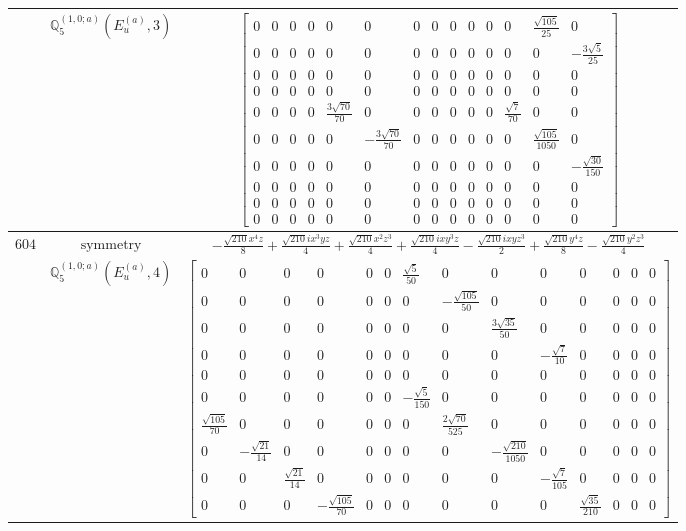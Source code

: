 \documentclass[fleqn,8pt,landscape]{jsarticle}
\begin{document}
\begin{longtable}{ccc}
$  $ & $ \mathbb{Q}_{5}^{(1,0;a)}(E_{u}^{(a)},3) $ & $ \begin{bmatrix} 0 & 0 & 0 & 0 & 0 & 0 & 0 & 0 & 0 & 0 & 0 & 0 & \frac{\sqrt{105}}{25} & 0 \\ 0 & 0 & 0 & 0 & 0 & 0 & 0 & 0 & 0 & 0 & 0 & 0 & 0 & - \frac{3 \sqrt{5}}{25} \\ 0 & 0 & 0 & 0 & 0 & 0 & 0 & 0 & 0 & 0 & 0 & 0 & 0 & 0 \\ 0 & 0 & 0 & 0 & 0 & 0 & 0 & 0 & 0 & 0 & 0 & 0 & 0 & 0 \\ 0 & 0 & 0 & 0 & \frac{3 \sqrt{70}}{70} & 0 & 0 & 0 & 0 & 0 & 0 & \frac{\sqrt{7}}{70} & 0 & 0 \\ 0 & 0 & 0 & 0 & 0 & - \frac{3 \sqrt{70}}{70} & 0 & 0 & 0 & 0 & 0 & 0 & \frac{\sqrt{105}}{1050} & 0 \\ 0 & 0 & 0 & 0 & 0 & 0 & 0 & 0 & 0 & 0 & 0 & 0 & 0 & - \frac{\sqrt{30}}{150} \\ 0 & 0 & 0 & 0 & 0 & 0 & 0 & 0 & 0 & 0 & 0 & 0 & 0 & 0 \\ 0 & 0 & 0 & 0 & 0 & 0 & 0 & 0 & 0 & 0 & 0 & 0 & 0 & 0 \\ 0 & 0 & 0 & 0 & 0 & 0 & 0 & 0 & 0 & 0 & 0 & 0 & 0 & 0 \end{bmatrix} $ \\ \hline
$ 604 $ & $ \text{symmetry} $ & $ - \frac{\sqrt{210} x^{4} z}{8} + \frac{\sqrt{210} i x^{3} y z}{4} + \frac{\sqrt{210} x^{2} z^{3}}{4} + \frac{\sqrt{210} i x y^{3} z}{4} - \frac{\sqrt{210} i x y z^{3}}{2} + \frac{\sqrt{210} y^{4} z}{8} - \frac{\sqrt{210} y^{2} z^{3}}{4} $ \\
$  $ & $ \mathbb{Q}_{5}^{(1,0;a)}(E_{u}^{(a)},4) $ & $ \begin{bmatrix} 0 & 0 & 0 & 0 & 0 & 0 & \frac{\sqrt{5}}{50} & 0 & 0 & 0 & 0 & 0 & 0 & 0 \\ 0 & 0 & 0 & 0 & 0 & 0 & 0 & - \frac{\sqrt{105}}{50} & 0 & 0 & 0 & 0 & 0 & 0 \\ 0 & 0 & 0 & 0 & 0 & 0 & 0 & 0 & \frac{3 \sqrt{35}}{50} & 0 & 0 & 0 & 0 & 0 \\ 0 & 0 & 0 & 0 & 0 & 0 & 0 & 0 & 0 & - \frac{\sqrt{7}}{10} & 0 & 0 & 0 & 0 \\ 0 & 0 & 0 & 0 & 0 & 0 & 0 & 0 & 0 & 0 & 0 & 0 & 0 & 0 \\ 0 & 0 & 0 & 0 & 0 & 0 & - \frac{\sqrt{5}}{150} & 0 & 0 & 0 & 0 & 0 & 0 & 0 \\ \frac{\sqrt{105}}{70} & 0 & 0 & 0 & 0 & 0 & 0 & \frac{2 \sqrt{70}}{525} & 0 & 0 & 0 & 0 & 0 & 0 \\ 0 & - \frac{\sqrt{21}}{14} & 0 & 0 & 0 & 0 & 0 & 0 & - \frac{\sqrt{210}}{1050} & 0 & 0 & 0 & 0 & 0 \\ 0 & 0 & \frac{\sqrt{21}}{14} & 0 & 0 & 0 & 0 & 0 & 0 & - \frac{\sqrt{7}}{105} & 0 & 0 & 0 & 0 \\ 0 & 0 & 0 & - \frac{\sqrt{105}}{70} & 0 & 0 & 0 & 0 & 0 & 0 & \frac{\sqrt{35}}{210} & 0 & 0 & 0 \end{bmatrix} $ \\ \hline

\end{longtable}
\end{document}
